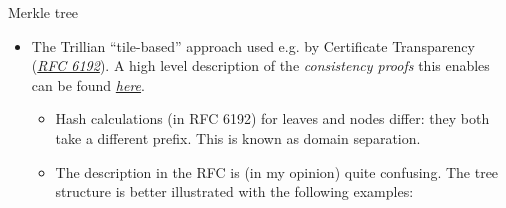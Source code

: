 \documentclass{practice}
\begin{document}
\begin{task}{Merkle tree}
\begin{itemize}
    \item The Trillian \enquote{tile-based} approach used e.g. by Certificate Transparency (\href{https://datatracker.ietf.org/doc/html/rfc9162#section-2.1.1}{\emph{RFC 6192}}).
    A high level description of the \emph{consistency proofs} this enables can be found \href{https://transparency.dev/verifiable-data-structures/#consistency-proof}{\textit{here}}.
  
    \begin{itemize}
      \item Hash calculations (in RFC 6192) for leaves and nodes differ: they both take a different prefix.
      This is known as domain separation.
      \item The description in the RFC is (in my opinion) quite confusing.
      The tree structure is better illustrated with the following examples:
    \end{itemize}


\end{itemize}
\end{task}
\end{document}
